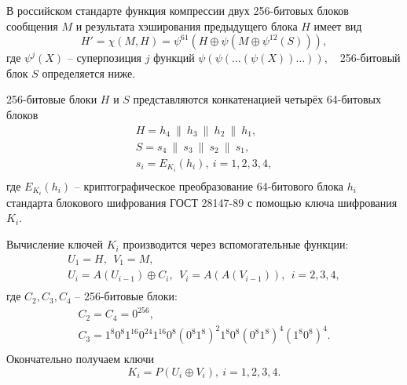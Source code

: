 В российском стандарте функция компрессии двух 256-битовых блоков сообщения $M$ и результата хэширования предыдущего блока $H$ имеет вид
\[
    H' = \chi(M, H) = \psi^{61}(H \oplus \psi(M \oplus \psi^{12}(S))),
\]
где $\psi^j(X)$ -- суперпозиция $j$ функций $\psi( \psi( \dots ( \psi( X)) \dots ))$, ~ 256-битовый блок $S$ определяется ниже.

256-битовые блоки $H$ и $S$ представляются конкатенацией четырёх 64-битовых блоков
\[ \begin{array}{l}
    H = h_4 ~\|~ h_3 ~\|~ h_2 ~\|~ h_1, \\
    S = s_4 ~\|~ s_3 ~\|~ s_2 ~\|~ s_1, \\
    s_i = E_{K_i}( h_i), ~ i = 1, 2, 3, 4, \\
\end{array} \]
где $E_{K_i}( h_i)$ -- криптографическое преобразование 64-битового блока $h_i$ стандарта блокового шифрования ГОСТ 28147-89 с помощью ключа шифрования $K_i$.

Вычисление ключей $K_i$ производится через вспомогательные функции:
\[ \begin{array}{c}
    U_1 = H, ~~ V_1 = M, \\
    U_i = A(U_{i-1}) \oplus C_i, ~~ V_i = A(A(V_{i-1})), ~~ i = 2, 3, 4, \\
\end{array} \]
где $C_2, C_3, C_4$ -- 256-битовые блоки:
\[ \begin{array}{c}
    C_2 = C_4 = 0^{256}, \\
    C_3 = 1^8 0^8 1^{16} 0^{24} 1^{16} 0^8 (0^8 1^8)^2 1^8 0^8 (0^8 1^8)^4 (1^8 0^8)^4. \\
\end{array} \]
Окончательно получаем ключи
\[
    K_i = P(U_i \oplus V_i), ~ i = 1,2,3,4.
\]


